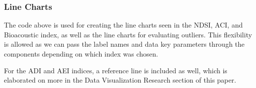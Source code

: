 \subsubsection{Line Charts}


\noindent The code above is used for creating the line charts seen in the NDSI, ACI, and Bioacoustic index, as well as the line charts for evaluating outliers. This flexibility is allowed as we can pass the label names and data key parameters through the components depending on which index was chosen.


\noindent For the ADI and AEI indices, a reference line is included as well, which is elaborated on more in the Data Visualization Research section of this paper.

